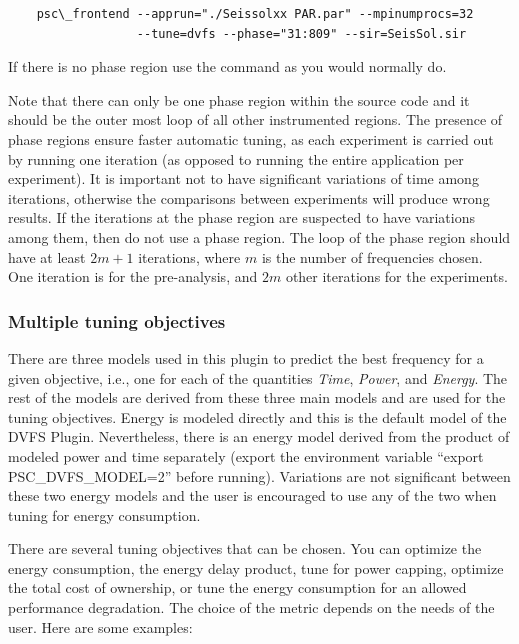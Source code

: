 \begin{verbatim}
    psc\_frontend --apprun="./Seissolxx PAR.par" --mpinumprocs=32 
                  --tune=dvfs --phase="31:809" --sir=SeisSol.sir
\end{verbatim}


If there is no phase region use the command as you would normally do.

Note that there can only be one phase region within the source code and it should be the outer most loop of all other instrumented regions. The presence of phase regions ensure faster automatic tuning, as each experiment is carried out by running one iteration (as opposed to running the entire application per experiment).  It is important not to have significant variations of time among iterations, otherwise the comparisons between experiments will produce wrong results. If the iterations at the phase region are suspected to have variations among them, then do not use a phase region. The loop of the phase region should have at least $2m+1$ iterations, where $m$ is the number of frequencies chosen. One iteration is for the pre-analysis, and $2m$ other iterations for the experiments.

\subsubsection{Multiple tuning objectives}

There are three models used in this plugin to predict the best frequency for a given objective, i.e., one for each of the quantities  \textit{Time}, \textit{Power}, and \textit{Energy}. The rest of the models are derived from these three main models and are used for the tuning objectives. Energy is modeled directly and this is the default model of the DVFS Plugin. Nevertheless, there is an energy model derived from the product of modeled power and time separately (export the environment variable ``export PSC\_DVFS\_MODEL=2'' before running). Variations are not significant between these two energy models and the user is encouraged to use any of the two when tuning for energy consumption.

There are several tuning objectives that can be chosen. You can optimize the energy consumption, the energy delay product, tune for power capping, optimize the total cost of ownership, or tune the energy consumption for an allowed performance degradation. The choice of the metric depends on the needs of the user. Here are some examples:

